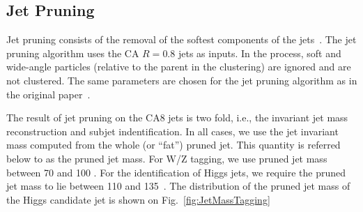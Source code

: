 



\subsection{Jet Pruning}
\label{sec:jetPruning}

Jet pruning consists of the removal of the softest
components of the jets~\cite{catop_cms,topwtag_pas}.
The jet pruning algorithm uses the CA $R=0.8$ jets as inputs. In the
process, soft and wide-angle particles (relative to the parent in the
clustering) are ignored and are not clustered.  
The same parameters are chosen for the jet
pruning algorithm as in the original paper~\cite{jetpruning1,jetpruning2}.



The result of jet pruning on the CA8 jets is two fold, i.e., the invariant jet mass 
reconstruction and subjet indentification.
In all cases,
we use the jet invariant mass computed from the whole (or ``fat'') 
pruned jet.  This quantity is referred below to as the pruned jet mass.
For W/Z tagging, we use pruned jet mass between 70 and 100 \GeVcc. 
For the identification of Higgs jets, we require the pruned jet mass to
lie between 110 and 135~\GeVcc.  The distribution of the pruned jet
mass of the Higgs candidate jet is shown on Fig.~\ref{fig:JetMassTagging} 


